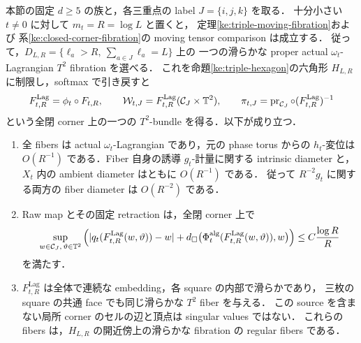 \begin{corollary}
\label{ke:actual-closed-corner}
本節の固定 $d\ge5$ の族と，各三重点の label $J=\{i,j,k\}$ を取る．
十分小さい $t\ne0$ に対して $m_t=R=\log L$ と置くと，
定理\ref{ke:triple-moving-fibration}および
系\ref{ke:closed-corner-fibration}の moving tensor comparison は成立する．
従って，$D_{L,R}=\{\ell_a>R,\ \sum_{a\in J}\ell_a=L\}$ 上の
一つの滑らかな proper actual $\omega_t$-Lagrangian $T^2$ fibration を選べる．
これを命題\ref{ke:triple-hexagon}の六角形 $H_{L,R}$ に制限し，softmax で引き戻すと
\[
 F_{t,R}^{\mathrm{Lag}}=\phi_t\circ F_{t,R},\qquad
 \mathcal W_{t,J}=F_{t,R}^{\mathrm{Lag}}(\mathcal C_J\times\mathbb T^2),\qquad
 \pi_{t,J}
 =\operatorname{pr}_{\mathcal C_J}\circ(F_{t,R}^{\mathrm{Lag}})^{-1}
\]
という全閉 corner 上の一つの $T^2$-bundle を得る．以下が成り立つ．
\begin{enumerate}
\item
全 fibers は actual $\omega_t$-Lagrangian であり，元の phase torus からの
$h_t$-変位は $O(R^{-1})$ である．Fiber 自身の誘導 $g_t$-計量に関する
intrinsic diameter と，$X_t$ 内の ambient diameter はともに $O(R^{-1})$ である．
従って $R^{-2}g_t$ に関する両方の fiber diameter は $O(R^{-2})$ である．

\item
Raw map とその固定 retraction は，全閉 corner 上で
\begin{equation}\label{ke:eq:actual-closed-corner-target}
 \sup_{w\in\mathcal C_J,\,\vartheta\in\mathbb T^2}
 \left(
 |q_t(F_{t,R}^{\mathrm{Lag}}(w,\vartheta))-w|
 +d_\square\bigl(\Phi_t^{\mathrm{alg}}
       (F_{t,R}^{\mathrm{Lag}}(w,\vartheta)),w\bigr)
 \right)
 \le C\frac{\log R}{R}
\end{equation}
を満たす．

\item
$F_{t,R}^{\mathrm{Lag}}$ は全体で連続な embedding，各 square の内部で滑らかであり，
三枚の square の共通 face でも同じ滑らかな $T^2$ fiber を与える．
この source を含まない局所 corner のセルの辺と頂点は singular values ではない．
これらの fibers は，$H_{L,R}$ の開近傍上の滑らかな fibration の regular fibers である．
\end{enumerate}
\end{corollary}
